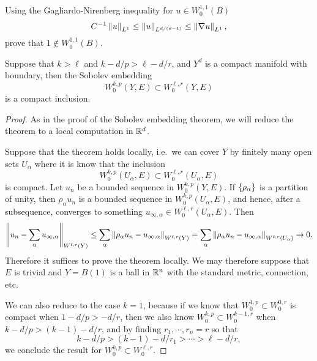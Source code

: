 \documentclass{amsart}
\begin{document}
\begin{xca}
  Using the Gagliardo-Nirenberg inequality for $u\in W^{1,1}_{0}(B)$
  \begin{equation*}
    C^{-1}\left\lVert u\right\rVert_{L^{1}}\le \left\lVert u\right\rVert_{L^{d/(d-1)}}\le \left\lVert\nabla u\right\rVert_{L^{1}},
  \end{equation*}
  prove that $1\not\in W^{1,1}_{0}(B)$.
\end{xca}
\begin{thm}
  Suppose that $k>\ell$ and $k-d/p>\ell-d/r$, and $Y^{d}$ is a compact manifold with boundary, then the Sobolev embedding
  \begin{equation*}
    W^{k,p}_{0}(Y,E)\subset W^{\ell,r}_{0}(Y,E)
  \end{equation*}
  is a compact inclusion.  
\end{thm}
\begin{proof}
  As in the proof of the Sobolev embedding theorem, we will reduce the theorem to a local computation in $\mathbb{R}^{d}$.

  Suppose that the theorem holds locally, i.e.\ we can cover $Y$ by finitely many open sets $U_{\alpha}$ where it is know that the inclusion
  \begin{equation*}
    W^{k,p}_{0}(U_{\alpha},E)\subset W^{\ell,r}_{0}(U_{\alpha},E)
  \end{equation*}
  is compact. Let $u_{n}$ be a bounded sequence in $W^{k,p}_{0}(Y,E)$. If $\left\{\rho_{\alpha}\right\}$ is a partition of unity, then $\rho_{\alpha}u_{n}$ is a bounded sequence in $W^{k,p}_{0}(U_{\alpha},E)$, and hence, after a subsequence, converges to something $u_{\infty,\alpha}\in W^{\ell,r}_{0}(U_{\alpha},E)$. Then
  \begin{equation*}
    \left\lVert u_{n}-\sum_{\alpha}u_{\infty,\alpha}\right\rVert_{W^{\ell,r}(Y)}\le \sum_{\alpha}\left\lVert\rho_{\alpha}u_{n}-u_{\infty,\alpha}\right\rVert_{W^{\ell,r}(Y)}=\sum_{\alpha}\left\lVert\rho_{\alpha}u_{n}-u_{\infty,\alpha}\right\rVert_{W^{\ell,r}(U_{\alpha})}\to 0.
  \end{equation*}
  Therefore it suffices to prove the theorem locally. We may therefore suppose that $E$ is trivial and $Y=B(1)$ is a ball in $\mathbb{R}^{n}$ with the standard metric, connection, etc.

  We can also reduce to the case $k=1$, because if we know that $W^{1,p}_{0}\subset W^{0,r}_{0}$ is compact when $1-d/p>-d/r$, then we also know $W^{k,p}_{0}\subset W^{k-1,r}_{0}$ when $k-d/p>(k-1)-d/r$, and by finding $r_{1},\cdots,r_{n}=r$ so that
  \begin{equation*}
    k-d/p>(k-1)-d/r_{1}>\cdots>\ell-d/r,
  \end{equation*}
  we conclude the result for $W^{k,p}_{0}\subset W^{\ell,r}_{0}$.


\end{proof}
\end{document}
